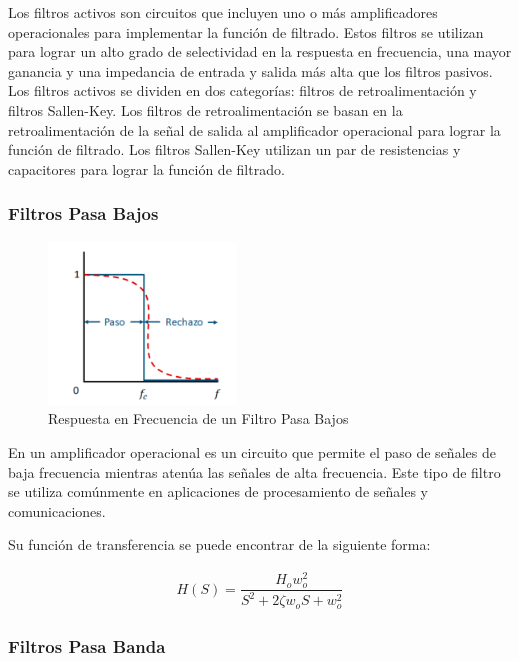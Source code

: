         Los filtros activos son circuitos que incluyen uno o más amplificadores operacionales para implementar la función de filtrado. Estos filtros se utilizan para lograr un alto grado de selectividad en la respuesta en frecuencia, una mayor ganancia y una impedancia de entrada y salida más alta que los filtros pasivos. Los filtros activos se dividen en dos categorías: filtros de retroalimentación y filtros Sallen-Key. Los filtros de retroalimentación se basan en la retroalimentación de la señal de salida al amplificador operacional para lograr la función de filtrado. Los filtros Sallen-Key utilizan un par de resistencias y capacitores para lograr la función de filtrado.

        \subsubsection{Filtros Pasa Bajos}

            \begin{figure}[H]
                \centering
                \includegraphics[width=5cm]{Imagenes/pasa_bajo.png}
                \caption{Respuesta en Frecuencia de un Filtro Pasa Bajos}
                \label{fig:pasa_bajo}
            \end{figure}
            
            En un amplificador operacional es un circuito que permite el paso de señales de baja frecuencia mientras atenúa las señales de alta frecuencia. Este tipo de filtro se utiliza comúnmente en aplicaciones de procesamiento de señales y comunicaciones. 
            
            Su función de transferencia se puede encontrar de la siguiente forma:

            \begin{gather}
                H(S)=\dfrac{H_ow_o^2}{S^2+2\zeta w_oS+w_o^2}
            \end{gather}

       \subsubsection{Filtros Pasa Banda}

